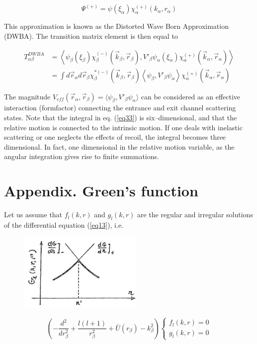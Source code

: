  \begin{equation}\label{eq32}
\Psi^{(+)}=\psi(\xi_\alpha) \chi_\alpha^{(+)} (k_\alpha, r_\alpha)
\end{equation}

This approximation is known as the Distorted Wave Born Approximation (DWBA). The transition matrix element is then equal to

\begin{equation}\label{eq33}
\begin{split}
T_{\alpha \beta}^{DWBA}&=\left\langle
\psi_\beta (\xi_\beta)\chi_\beta^{(-)}(\vec k_\beta, \vec r_\beta),V'_\beta \psi_\alpha(\xi_\alpha) \chi_\alpha^{(+)} (\vec k_\alpha,\vec r_\alpha)\right\rangle \\
& =\int d \vec r_\alpha d \vec r_\beta  \chi_\beta^{*(-)}(\vec k_\beta, \vec r_\beta)
\left\langle \psi_\beta ,V'_\beta \psi_\alpha \right\rangle \chi_\alpha^{(+)} (\vec k_\alpha,\vec r_\alpha)
\end{split}
\end{equation}

The magnitude $V_{eff}(\vec r_\alpha, \vec r_\beta)=\langle \psi_\beta,V'_\beta \psi_\alpha \rangle$ can be considered as an effective interaction (formfactor) connecting the entrance and exit channel scattering states.
Note that the integral in eq. (\ref{eq33}) is six--dimensional, and that the relative motion is connected to the intrinsic motion. If one deals with inelastic scattering or one neglects the effects of recoil, the integral becomes three dimensional. In fact, one dimensional in the relative motion variable, as the angular integration gives rise to finite summations.
\section{Appendix. Green's function}


Let us assume that $f_l(k,r)$ and $g_l(k,r)$ are the regular and irregular solutions of the differential equation (\ref{eq13}), i.e.

\begin{figure}
\centerline{\includegraphics*[width=6cm,angle=0]{C4/figs_C4/3_1.pdf}}
\caption{}\label{fig3rd_1}
\end{figure}
 \begin{equation}\label{eqA1}
\left( -\frac{d^2}{dr^2_\beta}+\frac{l(l+1)}{r^2_\beta}+\bar U (r_ \beta)-k_\beta^2\right)
\left \lbrace \begin{aligned}
f_l(k,r)=0\\
g_l(k,r)=0
\end{aligned}
\right.
\end{equation}

